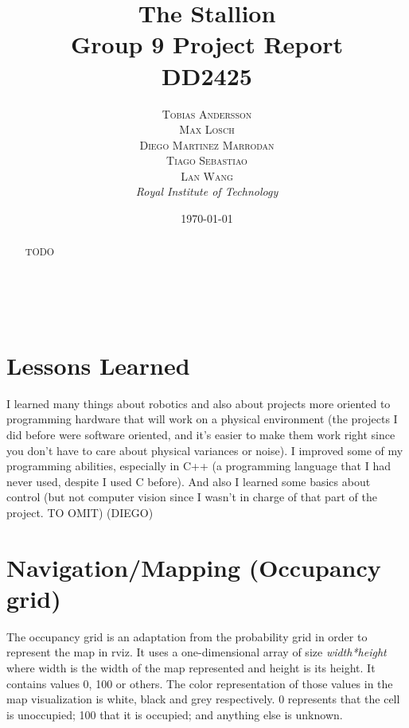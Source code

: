\documentclass[a4paper, 11pt]{article} %
\title{\textbf{The Stallion}\\ %
Group 9 Project Report\\DD2425} %
\author{\textsc{
Tobias Andersson\\
Max Losch\\
Diego Martinez Marrodan\\
Tiago Sebastiao\\
Lan Wang} %
\\{\textit{Royal Institute of Technology}}
} %
\date{\today} %
\makeatletter
\renewcommand{\maketitle}{ %
\begin{flushright} %
{\LARGE\@title} %

\vspace{50pt} %

{\large\@author} %
\\\@date %

\vspace{40pt} %
\end{flushright}
}
\makeatother
\begin{document}
\maketitle %



\begin{abstract}
TODO
\end{abstract}

\vspace{30pt} %


\section*{Lessons Learned}

\hspace{10 mm}I learned many things about robotics and also about projects more oriented to programming hardware that will work on a physical environment (the projects I did before were software oriented, and it's easier to make them work right since you don't have to care about physical variances or noise). 
I improved some of my programming abilities, especially in C++ (a programming language that I had never used, despite I used C before).
And also I learned some basics about control (but not computer vision since I wasn't in charge of that part of the project. TO OMIT) (DIEGO)


\section*{Navigation/Mapping (Occupancy grid)}
\hspace{10 mm}The occupancy grid is an adaptation from the probability grid in order to represent the map in rviz.
It uses a one-dimensional array of size \textit{width*height} where width is the width of the map represented and height is its height.
It contains values 0, 100 or others. 
The color representation of those values in the map visualization is white, black and grey respectively.
0 represents that the cell is unoccupied; 100 that it is occupied; and anything else is unknown.
\end{document}
